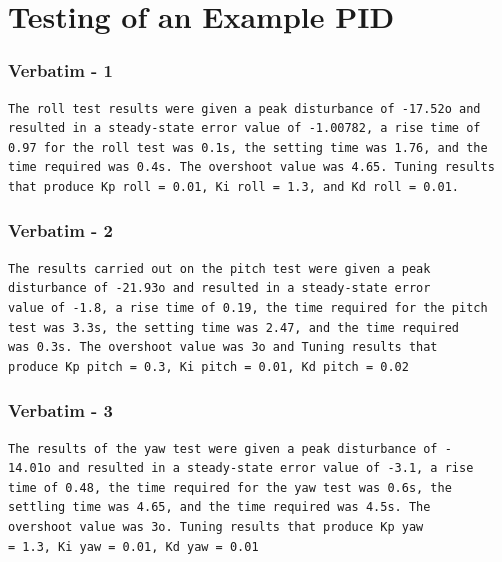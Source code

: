 \documentclass{beamer}
\begin{document}
\section{Testing of an Example PID}
\begin{frame}[fragile] %
\frametitle{Verbatim - 1}
\begin{example}
\begin{lstlisting}
The roll test results were given a peak disturbance of -17.52o and resulted in a steady-state error value of -1.00782, a rise time of 0.97 for the roll test was 0.1s, the setting time was 1.76, and the time required was 0.4s. The overshoot value was 4.65. Tuning results that produce Kp roll = 0.01, Ki roll = 1.3, and Kd roll = 0.01.
\end{lstlisting}
\cite{Susanto2024}
\end{example}
\end{frame}

\begin{frame}[fragile] %
\frametitle{Verbatim - 2}
\begin{example}
\begin{lstlisting}
The results carried out on the pitch test were given a peak
disturbance of -21.93o and resulted in a steady-state error
value of -1.8, a rise time of 0.19, the time required for the pitch
test was 3.3s, the setting time was 2.47, and the time required
was 0.3s. The overshoot value was 3o and Tuning results that
produce Kp pitch = 0.3, Ki pitch = 0.01, Kd pitch = 0.02
\end{lstlisting}
\cite{Susanto2024}
\end{example}
\end{frame}

\begin{frame}[fragile] %
\frametitle{Verbatim - 3}
\begin{example}
\begin{lstlisting}
The results of the yaw test were given a peak disturbance of -
14.01o and resulted in a steady-state error value of -3.1, a rise
time of 0.48, the time required for the yaw test was 0.6s, the
settling time was 4.65, and the time required was 4.5s. The
overshoot value was 3o. Tuning results that produce Kp yaw
= 1.3, Ki yaw = 0.01, Kd yaw = 0.01 
\end{lstlisting}
\cite{Susanto2024}
\end{example}
\end{frame}
\end{document}
